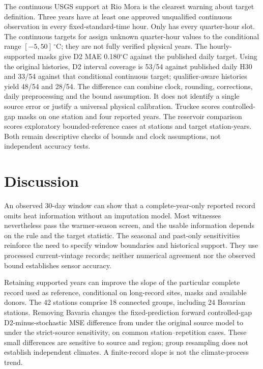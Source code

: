 \documentclass[draft,linenumbers]{agujournal2025}
\begin{document}
The continuous USGS support at Rio Mora is the clearest warning about target definition. Three years have at least one approved unqualified continuous observation in every fixed-standard-time hour. Only \RioCompleteQuarterYear{} has every quarter-hour slot. The continuous targets for \RioBoundedYears{} assign unknown quarter-hour values to the conditional range $[-5,50]\,^{\circ}$C; they are not fully verified physical years. The \RioHourlyMasks{} hourly-supported masks give D2 MAE 0.180$^{\circ}$C against the published daily target. Using the original histories, D2 interval coverage is 53/54 against published daily H30 and 33/54 against that conditional continuous target; qualifier-aware histories yield 48/54 and 28/54. The difference can combine clock, rounding, corrections, daily preprocessing and the bound assumption. It does not identify a single source error or justify a universal physical calibration. Truckee scores \TruckeeCases{} controlled-gap masks on one station and four reported years. The reservoir comparison scores \ResScoreCases{} exploratory bounded-reference cases at \ResScoreStations{} stations and \ResScoreYears{} target station-years. Both remain descriptive checks of bounds and clock assumptions, not independent accuracy tests.

\section{Discussion}
An observed 30-day window can show that a complete-year-only reported record omits heat information without an imputation model. Most witnesses nevertheless pass the warmer-season screen, and the usable information depends on the rule and the target statistic. The seasonal and past-only sensitivities reinforce the need to specify window boundaries and historical support. They use processed current-vintage records; neither numerical agreement nor the observed bound establishes sensor accuracy.

Retaining supported years can improve the slope of the particular complete record used as reference, conditional on long-record sites, masks and available donors. The 42 stations comprise 18 connected groups, including 24 Bavarian stations. Removing Bavaria changes the fixed-prediction forward controlled-gap D2-minus-stochastic MSE difference from \SRBayernCrossOld{} under the original source model to \SRBayernCrossNew{} under the strict-source sensitivity, on \SRBayernCrossN{} common station--repetition cases. These small differences are sensitive to source and region; group resampling does not establish independent climates. A finite-record slope is not the climate-process trend.
\end{document}
